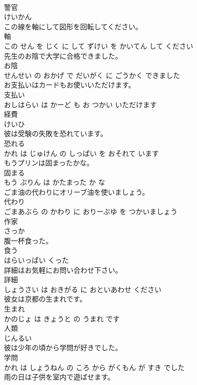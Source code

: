 \documentclass[8pt]{extreport}
\begin{document}
\begin{CJK}{UTF8}{min}
\\	警官	
\\	けいかん		
\\	この線を軸にして図形を回転してください。	
\\	軸 
\\	この せん を じく に して ずけい を かいてん して ください		
\\	先生のお陰で大学に合格できました。	
\\	お陰 
\\	せんせい の おかげ で だいがく に ごうかく できました		
\\	お支払いはカードもお使いいただけます。	
\\	支払い 
\\	おしはらい は かーど も お つかい いただけます		
\\	経費	
\\	けいひ		
\\	彼は受験の失敗を恐れています。	
\\	恐れる 
\\	かれ は じゅけん の しっぱい を おそれて います		
\\	もうプリンは固まったかな。	
\\	固まる 
\\	もう ぷりん は かたまった か な		
\\	ごま油の代わりにオリーブ油を使いましょう。	
\\	代わり 
\\	ごまあぶら の かわり に おりーぶゆ を つかいましょう		
\\	作家	
\\	さっか		
\\	腹一杯食った。	
\\	食う 
\\	はらいっぱい くった		
\\	詳細はお気軽にお問い合わせ下さい。	
\\	詳細 
\\	しょうさい は おきがる に おといあわせ ください		
\\	彼女は京都の生まれです。	
\\	生まれ 
\\	かのじょ は きょうと の うまれ です		
\\	人類	
\\	じんるい		
\\	彼は少年の頃から学問が好きでした。	
\\	学問 
\\	かれ は しょうねん の ころ から がくもん が すき でした		
\\	雨の日は子供を室内で遊ばせます。	

\end{CJK}
\end{document}
